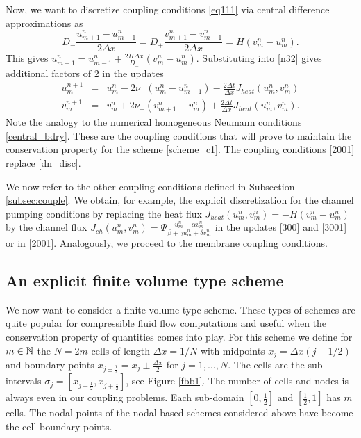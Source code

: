 Now, we want to discretize coupling conditions \eqref{eq111} via central difference approximations as
%
\begin{equation}
 D_{-}\frac{u_{m+1}^{n}-u_{m-1}^n}{2\Delta x}=D_{+}\frac{v_{m+1}^{n}-v_{m-1}^n}{2\Delta x}=H(v^n_m-u^n_m).
\end{equation}
%
This gives $u_{m+1}^{n}=u_{m-1}^n+\frac{2H\Delta x}{D_{-}}(v_{m}^n-u_{m}^n)$.
Substituting into \eqref{n32} gives additional factors of $2$ in the updates
%
\begin{eqnarray}
\label{2001}
u_{m}^{n+1}&=&u^n_m-2\nu_-(u^n_{m}-u_{m-1}^n)-\frac{2\Delta t}{\Delta x} J_{heat}(u^n_m,v_m^n)\nonumber\\
v_{m}^{n+1}&=&v^n_m+2\nu_+ (v_{m+1}^n-v^n_m)+\frac{2\Delta t}{\Delta x}J_{heat}(u^n_m,v_m^n).
\end{eqnarray}
%
Note the analogy to the numerical homogeneous Neumann conditions \eqref{central_bdry}. These are the coupling
conditions that will prove to maintain the conservation property for the scheme \eqref{scheme_c1}. The coupling conditions
\eqref{2001} replace \eqref{dn_disc}.

We now refer to the other coupling conditions defined in Subsection \ref{subsec:couple}.  
We obtain, for example, the explicit discretization for the channel pumping conditions
by replacing the heat flux $J_{heat}(u_m^n,v_m^n)=-H(v^n_m-u^n_m)$ 
by the channel flux $J_{ch}(u_m^n,v_m^n)=\Psi \frac{u^n_m-\alpha v^n_m}{\beta+\gamma u^n_m+\delta v^n_m}$ 
in the updates \eqref{300} and \eqref{3001} or in \eqref{2001}. Analogously, we proceed to the membrane coupling conditions.

%
%
\subsection{An explicit finite volume type scheme}
\label{sub_fv}
%
%

We now want to consider a finite volume type scheme. These types of schemes are quite popular for compressible fluid flow computations
and useful when the conservation property of quantities comes into play. 
For this scheme we define for $m\in\mathbb{N}$ the $N=2m$ cells of length $\Delta x=1/N$ with midpoints $x_j = \Delta x(j-1/2)$ and 
boundary points $x_{j\pm\frac{1}{2}}=x_j\pm \frac{\Delta x}{2}$
for $j=1,\ldots ,N$. The cells are the sub-intervals $\sigma_j=[x_{j-\frac{1}{2}}, x_{j+\frac{1}{2}}]$, see
Figure \ref{fbb1}. The number of cells and nodes is always even in our coupling problems. Each sub-domain $[0,\frac 12]$
and $[\frac 12,1]$ has $m$ cells. The nodal points of
the nodal-based schemes considered above
have become the cell boundary points.  

